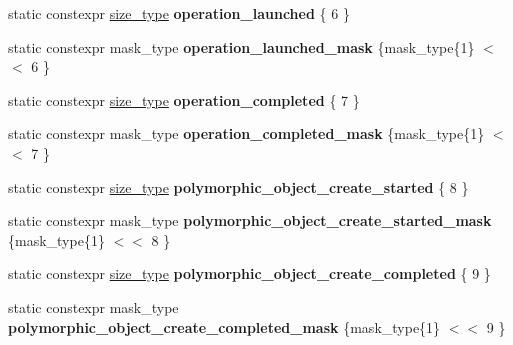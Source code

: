 \begin{DoxyCompactItemize}
\item 
\mbox{\label{classgko_1_1log_1_1Logger_a7e263c13a5715bc7ff3c22cee8554f86}} 
static constexpr \hyperlink{namespacegko_a6e5c95df0ae4e47aab2f604a22d98ee7}{size\+\_\+type} {\bfseries operation\+\_\+launched} \{ 6 \}
\item 
\mbox{\label{classgko_1_1log_1_1Logger_ae0697986f696b3746def13fc306d7612}} 
static constexpr mask\+\_\+type {\bfseries operation\+\_\+launched\+\_\+mask} \{mask\+\_\+type\{1\} $<$$<$ 6 \}
\item 
\mbox{\label{classgko_1_1log_1_1Logger_a9a37fe183842292ffe5bcc81fbd5b645}} 
static constexpr \hyperlink{namespacegko_a6e5c95df0ae4e47aab2f604a22d98ee7}{size\+\_\+type} {\bfseries operation\+\_\+completed} \{ 7 \}
\item 
\mbox{\label{classgko_1_1log_1_1Logger_a8107addc02b399c38e665d55bc936a70}} 
static constexpr mask\+\_\+type {\bfseries operation\+\_\+completed\+\_\+mask} \{mask\+\_\+type\{1\} $<$$<$ 7 \}
\item 
\mbox{\label{classgko_1_1log_1_1Logger_a920f605e67d041e3337e5317cf071441}} 
static constexpr \hyperlink{namespacegko_a6e5c95df0ae4e47aab2f604a22d98ee7}{size\+\_\+type} {\bfseries polymorphic\+\_\+object\+\_\+create\+\_\+started} \{ 8 \}
\item 
\mbox{\label{classgko_1_1log_1_1Logger_a9279a26cc65995eb5fc3cfb55b21e3cc}} 
static constexpr mask\+\_\+type {\bfseries polymorphic\+\_\+object\+\_\+create\+\_\+started\+\_\+mask} \{mask\+\_\+type\{1\} $<$$<$ 8 \}
\item 
\mbox{\label{classgko_1_1log_1_1Logger_a712c7724072bbb3e3a67ea3d3c75aef5}} 
static constexpr \hyperlink{namespacegko_a6e5c95df0ae4e47aab2f604a22d98ee7}{size\+\_\+type} {\bfseries polymorphic\+\_\+object\+\_\+create\+\_\+completed} \{ 9 \}
\item 
\mbox{\label{classgko_1_1log_1_1Logger_ad6db4170485cd607505d52485b632e71}} 
static constexpr mask\+\_\+type {\bfseries polymorphic\+\_\+object\+\_\+create\+\_\+completed\+\_\+mask} \{mask\+\_\+type\{1\} $<$$<$ 9 \}

\end{DoxyCompactItemize}
